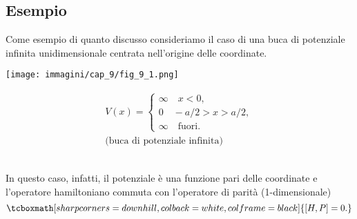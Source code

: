 \documentclass[a4paper,12pt,oneside]{book}
\begin{document}
\subsection*{Esempio}
Come esempio di quanto discusso consideriamo il caso di una buca di potenziale infinita unidimensionale centrata nell'origine delle coordinate.\\
\begin{minipage}{.4\textwidth}
\texttt{[image: immagini/cap\_9/fig\_9\_1.png]}	
\end{minipage}
\begin{minipage}{.55\textwidth}
\begin{align}
V(x)= 
\begin{cases}
\infty \quad x<0,\\
0 \quad -a/2>x>a/2, \\
\infty \quad \textrm{fuori}.
\end{cases}
\\
\textrm{(buca di potenziale infinita)} \nonumber
\end{align}
\end{minipage}\\[0.5cm]

In questo caso, infatti, il potenziale è una funzione pari delle coordinate e l'operatore hamiltoniano commuta con l'operatore di parità (1-dimensionale)
	\begin{equation}
	\tcboxmath[sharp corners=downhill, colback=white, colframe=black]{
		\comm {H}{P}= 0 .
		}
	\end{equation}\\
	
\end{document}
